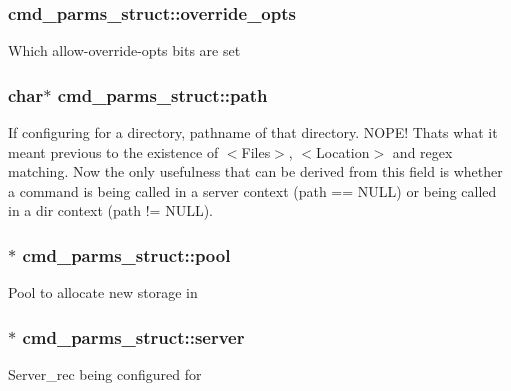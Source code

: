\subsubsection[{\texorpdfstring{override\+\_\+opts}{override_opts}}]{ cmd\+\_\+parms\+\_\+struct\+::override\+\_\+opts}\hypertarget{structcmd__parms__struct_abe72299ee12662d37b7f0b494366c6ff}{}\label{structcmd__parms__struct_abe72299ee12662d37b7f0b494366c6ff}
Which allow-\/override-\/opts bits are set 
\subsubsection[{\texorpdfstring{path}{path}}]{\setlength{\rightskip}{0pt plus 5cm}char$\ast$ cmd\+\_\+parms\+\_\+struct\+::path}\hypertarget{structcmd__parms__struct_ae91b816d1328294b32b801f357f4c13a}{}\label{structcmd__parms__struct_ae91b816d1328294b32b801f357f4c13a}
If configuring for a directory, pathname of that directory. N\+O\+P\+E! That\textquotesingle{}s what it meant previous to the existence of $<$Files$>$, $<$Location$>$ and regex matching. Now the only usefulness that can be derived from this field is whether a command is being called in a server context (path == N\+U\+LL) or being called in a dir context (path != N\+U\+LL). 
\subsubsection[{\texorpdfstring{pool}{pool}}]{$\ast$ cmd\+\_\+parms\+\_\+struct\+::pool}\hypertarget{structcmd__parms__struct_a70b586677914245741baf62bc3cd57b8}{}\label{structcmd__parms__struct_a70b586677914245741baf62bc3cd57b8}
Pool to allocate new storage in 
\subsubsection[{\texorpdfstring{server}{server}}]{$\ast$ cmd\+\_\+parms\+\_\+struct\+::server}\hypertarget{structcmd__parms__struct_ac89b2e2ae2254315b7a2a0df4c633e28}{}\label{structcmd__parms__struct_ac89b2e2ae2254315b7a2a0df4c633e28}
Server\+\_\+rec being configured for 

